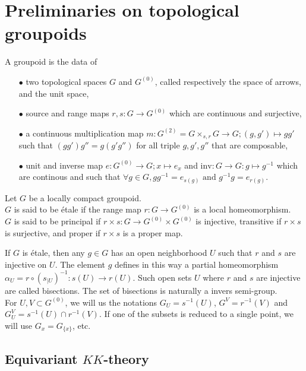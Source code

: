 \section{Preliminaries on topological groupoids}

\begin{definition}
A groupoid is the data of 
\begin{itemize}
\item[$\bullet$] two topological spaces $G$ and $G^{(0)}$, called respectively the space of arrows, and the unit space,
\item[$\bullet$] source and range maps $r,s : G\rightarrow G^{(0)}$ which are continuous and surjective,
\item[$\bullet$] a continuous multiplication map $m : G^{(2)}=G\times_{s,r}G\rightarrow G; (g,g')\mapsto gg'$ such that $(gg')g''=g(g'g'')$ for all triple $g,g',g''$ that are composable,
\item[$\bullet$] unit and inverse map $e : G^{(0)}\rightarrow G; x\mapsto e_x$ and $\text{inv} : G\rightarrow G: g\mapsto g^{-1}$ which are continous and such that $\forall g\in G, gg^{-1}=e_{s(g)} \text{ and }g^{-1}g=e_{r(g)}$.
\end{itemize} 
\end{definition}

\begin{definition}
Let $G$ be a locally compact groupoid.\\
$G$ is said to be étale if the range map $r:G\rightarrow G^{(0)}$ is a local homeomorphism.\\
$G$ is said to be principal if $r\times s : G\rightarrow G^{(0)}\times G^{(0)}$ is injective, transitive if $r\times s $ is surjective, and proper if $r\times s $ is a proper map. 
\end{definition}

If $G$ is étale, then any $g\in G$ has an open neighborhood $U$ such that $r$ and $s$ are injective on $U$. The element $g$ defines in this way a partial homeomorphism $\alpha_U = r\circ (s_{|U})^{-1} : s(U)\rightarrow r(U)$. Such open sets $U$ where $r$ and $s$ are injective are called bisections. The set of bisections is naturally a invers semi-group.\\

For $U,V\subset G^{(0)}$, we will us the notations $G_U=s^{-1}(U)$, $G^V=r^{-1}(V)$ and $G_U^V=s^{-1}(U)\cap r^{-1}(V)$. If one of the subsets is reduced to a single point, we will use $G_x=G_{\{x\}}$, etc.

\subsection{Equivariant $KK$-theory}

